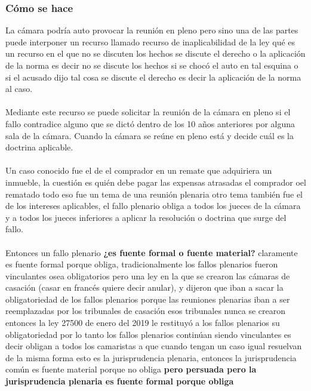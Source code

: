 \documentclass[12pt]{book}
\begin{document}
\subsubsection{Cómo se hace}
La cámara podría auto provocar la reunión en pleno pero sino una de las partes puede interponer un recurso llamado recurso de inaplicabilidad de la ley qué es un recurso en el que no se discuten los hechos se discute el derecho o la aplicación de la norma es decir no se discute los hechos si se chocó el auto en tal esquina o si el acusado dijo tal cosa se discute el derecho es decir la aplicación de la norma al caso.
\\
\\
Mediante este recurso se puede solicitar la reunión de la cámara en pleno si el fallo contradice alguno que se dictó dentro de los 10 años anteriores por alguna sala de la cámara. Cuando la cámara se reúne en pleno está y decide cuál es la doctrina aplicable.
\\
\\
Un caso conocido fue el de el comprador en un remate que adquiriera un inmueble, la cuestión es quién debe pagar las expensas atrasadas el comprador oel rematado todo eso fue un tema de una reunión plenaria otro tema también fue el de los intereses aplicables, el fallo plenario obliga a todos los jueces de la cámara y a todos los jueces inferiores a aplicar la resolución o doctrina que surge del fallo.
\\ \\
Entonces un fallo plenario \textbf{¿es fuente formal o fuente material?} claramente es fuente formal porque obliga, tradicionalmente los fallos plenarios fueron vinculantes osea obligatorios pero una ley en la que se crearon las cámaras de casación (casar en francés quiere decir anular), y dijeron que iban a sacar la obligatoriedad de los fallos plenarios porque las reuniones plenarias iban a ser reemplazadas por los tribunales de casación esos tribunales nunca se crearon entonces la ley 27500 de enero del 2019 le restituyó a los fallos plenarios su obligatoriedad por lo tanto los fallos plenarios continúan siendo vinculantes es decir obligan a todos los camaristas a que cuando tengan un caso igual resuelvan de la misma forma esto es la jurisprudencia plenaria, entonces la jurisprudencia común es fuente material porque no obliga \textbf{pero persuada pero la jurisprudencia plenaria es fuente formal porque obliga}
\end{document}
